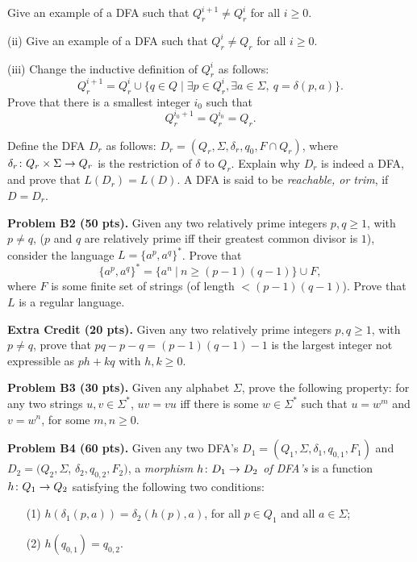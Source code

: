 \documentclass[12pt]{article}
\begin{document}
\medskip
Give an example of a DFA such that
$Q_{r}^{i+1} \not= Q_{r}^{i}$ for all $i\geq 0$.

\medskip
(ii) Give an example of a DFA such that
$Q_{r}^{i} \not= Q_{r}$
for all $i \geq 0$.

\medskip
(iii) Change the inductive definition of $Q^i_r$ as follows:
\[
Q_{r}^{i+1} = Q^i_r\cup
\{q\in Q \mid \exists p\in Q_{r}^{i}, \exists a\in\Sigma,\>
q = \delta(p,a)\}.
\]
Prove that there is a smallest integer $i_0$ such that
\[
Q_{r}^{i_{0}+1} = Q_{r}^{i_{0}} = Q_{r}.
\]

Define the DFA $D_r$ as follows:
$D_r = (Q_r,\Sigma,\delta_r,q_0,F\cap Q_r)$,
where $\delta_r\colon Q_r\times\Sigma\rightarrow Q_r$
is the restriction of $\delta$ to $Q_r$.
Explain why $D_r$ is indeed a DFA, and 
prove that $L(D_r) = L(D)$.
A DFA is said to be {\it reachable, or trim\/}, if
$D = D_r$.

\vspace{0.25cm}
\noindent
{\bf Problem B2 (50 pts).} 
Given any two relatively prime integers $p, q\geq 1$, with $p\not= q$,
($p$ and $q$ are relatively prime iff
their greatest common divisor  is $1$), consider
the language
$L = \{a^p, a^q\}^*$. Prove that
$$\{a^p, a^q\}^* = \{a^n\ |\ n \geq (p-1)(q-1)\}\cup F,$$
where $F$ is some finite set of strings (of length $< (p - 1)(q - 1)$).
Prove that $L$ is a regular language.

\medskip\noindent
{\bf Extra Credit (20 pts).}
Given any two relatively prime integers $p, q\geq 1$, with $p\not= q$,
prove that $pq - p - q = (p-1)(q-1) -1$
is the largest integer not
expressible as $ph + kq$ with $h, k\geq 0$.

\vspace {0.25cm}
\noindent
{\bf Problem B3 (30 pts).} 
Given any alphabet $\Sigma$, prove the following
property: for any two strings $u, v\in\Sigma^*$, $uv = vu$ iff
there is some $w\in\Sigma^*$ such that $u = w^m$ and $v = w^n$, for
some $m, n\geq 0$.



\vspace{0.25cm}
\noindent
{\bf Problem B4 (60 pts).}
Given any two DFA's 
$D_1 = (Q_1, \Sigma, \delta_1, q_{0, 1}, F_1)$
and \\
$D_2 = (Q_2, \Sigma$, $\delta_2, q_{0, 2}, F_2)$,
a {\it morphism $h\colon D_1\rightarrow D_2$ of DFA's\/} is a function
$h\colon Q_1\rightarrow Q_2$ satisfying the following two conditions:

\begin{enumerate}
\item[(1)]
$h(\delta_1(p, a)) = \delta_2(h(p), a)$,
for all $p\in Q_1$ and all $a\in \Sigma$;
\item[(2)]
$h(q_{0, 1}) = q_{0, 2}$.
\end{enumerate}
\end{document}
